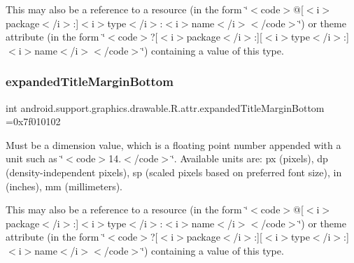 This may also be a reference to a resource (in the form \char`\"{}$<$code$>$@\mbox{[}$<$i$>$package$<$/i$>$\+:\mbox{]}$<$i$>$type$<$/i$>$\+:$<$i$>$name$<$/i$>$$<$/code$>$\char`\"{}) or theme attribute (in the form \char`\"{}$<$code$>$?\mbox{[}$<$i$>$package$<$/i$>$\+:\mbox{]}\mbox{[}$<$i$>$type$<$/i$>$\+:\mbox{]}$<$i$>$name$<$/i$>$$<$/code$>$\char`\"{}) containing a value of this type. \mbox{\label{classandroid_1_1support_1_1graphics_1_1drawable_1_1R_1_1attr_aa1ee679f6eb9a21bf97688b9f45a9062}} 
\subsubsection{\texorpdfstring{expanded\+Title\+Margin\+Bottom}{expandedTitleMarginBottom}}
{\footnotesize\ttfamily int android.\+support.\+graphics.\+drawable.\+R.\+attr.\+expanded\+Title\+Margin\+Bottom =0x7f010102\hspace{0.3cm}{\ttfamily [static]}}

Must be a dimension value, which is a floating point number appended with a unit such as \char`\"{}$<$code$>$14.\+5sp$<$/code$>$\char`\"{}. Available units are\+: px (pixels), dp (density-\/independent pixels), sp (scaled pixels based on preferred font size), in (inches), mm (millimeters). 

This may also be a reference to a resource (in the form \char`\"{}$<$code$>$@\mbox{[}$<$i$>$package$<$/i$>$\+:\mbox{]}$<$i$>$type$<$/i$>$\+:$<$i$>$name$<$/i$>$$<$/code$>$\char`\"{}) or theme attribute (in the form \char`\"{}$<$code$>$?\mbox{[}$<$i$>$package$<$/i$>$\+:\mbox{]}\mbox{[}$<$i$>$type$<$/i$>$\+:\mbox{]}$<$i$>$name$<$/i$>$$<$/code$>$\char`\"{}) containing a value of this type. \mbox{\label{classandroid_1_1support_1_1graphics_1_1drawable_1_1R_1_1attr_a1964b53327df6ecd236bdaffeb357314}} 

